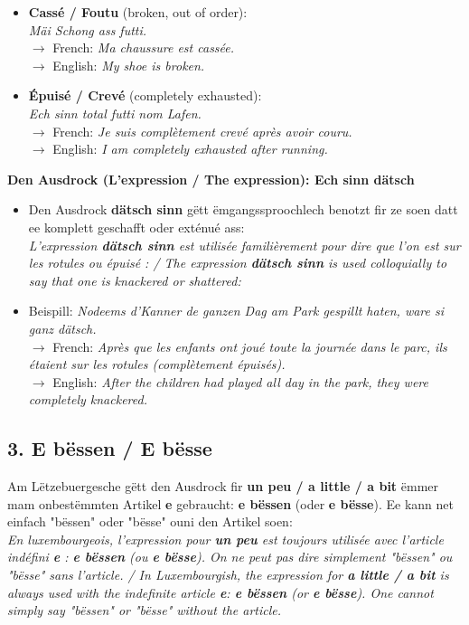 \begin{itemize}
    \item \textbf{Cassé / Foutu} (broken, out of order): \\
    \textit{Mäi Schong ass futti.} \\
    $\rightarrow$ French: \textit{Ma chaussure est cassée.} \\
    $\rightarrow$ English: \textit{My shoe is broken.}
    
    \item \textbf{Épuisé / Crevé} (completely exhausted): \\
    \textit{Ech sinn total futti nom Lafen.} \\
    $\rightarrow$ French: \textit{Je suis complètement crevé après avoir couru.} \\
    $\rightarrow$ English: \textit{I am completely exhausted after running.}
\end{itemize}

\noindent\textbf{Den Ausdrock (L'expression / The expression): Ech sinn dätsch}
\begin{itemize}
    \item Den Ausdrock \textbf{dätsch sinn} gëtt ëmgangssproochlech benotzt fir ze soen datt ee komplett geschafft oder exténué ass: \\
    \textit{L'expression \textbf{dätsch sinn} est utilisée familièrement pour dire que l'on est sur les rotules ou épuisé : / The expression \textbf{dätsch sinn} is used colloquially to say that one is knackered or shattered:}
    \item Beispill: \textit{Nodeems d'Kanner de ganzen Dag am Park gespillt haten, ware si ganz dätsch.} \\
    $\rightarrow$ French: \textit{Après que les enfants ont joué toute la journée dans le parc, ils étaient sur les rotules (complètement épuisés).} \\
    $\rightarrow$ English: \textit{After the children had played all day in the park, they were completely knackered.}
\end{itemize}

\subsection*{3. E bëssen / E bësse}
Am Lëtzebuergesche gëtt den Ausdrock fir \textbf{un peu / a little / a bit} ëmmer mam onbestëmmten Artikel \textbf{e} gebraucht: \textbf{e bëssen} (oder \textbf{e bësse}). Ee kann net einfach "bëssen" oder "bësse" ouni den Artikel soen: \\
\textit{En luxembourgeois, l'expression pour \textbf{un peu} est toujours utilisée avec l'article indéfini \textbf{e} : \textbf{e bëssen} (ou \textbf{e bësse}). On ne peut pas dire simplement "bëssen" ou "bësse" sans l'article. / In Luxembourgish, the expression for \textbf{a little / a bit} is always used with the indefinite article \textbf{e}: \textbf{e bëssen} (or \textbf{e bësse}). One cannot simply say "bëssen" or "bësse" without the article.}

